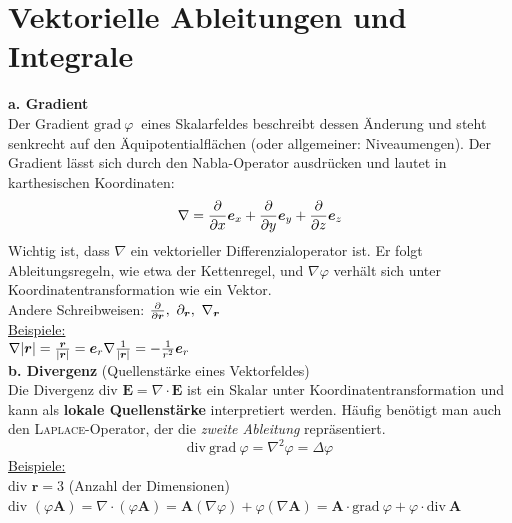\section{Vektorielle Ableitungen und Integrale}
\textbf{a. Gradient}\\
\linebreak
Der Gradient $\mathrm{grad\ }\varphi\ $ eines Skalarfeldes beschreibt dessen Änderung und steht senkrecht auf den Äquipotentialflächen (oder allgemeiner: Niveaumengen). Der Gradient lässt sich durch den Nabla-Operator ausdrücken und lautet in karthesischen Koordinaten: 
\begin{equation*}
\nabla=\frac{\partial{}}{\partial{x}}\bm{e}_x+\frac{\partial{}}{\partial{y}}\bm{e}_y+\frac{\partial{}}{\partial{z}}\bm{e}_z
\end{equation*}
Wichtig ist, dass $\nabla$ ein vektorieller Differenzialoperator ist. Er folgt Ableitungsregeln, wie etwa der Kettenregel, und $\nabla\varphi$ verhält sich unter Koordinatentransformation wie ein Vektor.\\
\linebreak
Andere Schreibweisen: $\pdiff{}{\bm{r}},\ \partial_{\bm{r}},\ \nabla_{\bm{r}}$\\
\linebreak
\underline{Beispiele:}\\
\linebreak
$\nabla |\bm{r}|=\frac{\bm{r}}{|\bm{r}|}=\bm{e}_r\\
\nabla \frac{1}{|\bm{r}|}=-\frac{1}{r^2}\bm{e}_r$\\
\linebreak\linebreak
\textbf{b. Divergenz} (Quellenstärke eines Vektorfeldes)\\
\linebreak
Die Divergenz div $\bm{E}=\nabla\cdot\bm{E}$ ist ein Skalar unter Koordinatentransformation und kann als \textbf{lokale Quellenstärke} interpretiert werden. Häufig benötigt man auch den \textsc{Laplace}-Operator, der die \emph{zweite Ableitung} repräsentiert.\\
\begin{equation*}
\mathrm{div\ grad\ } \varphi=\nabla^2\varphi=\Delta\varphi
\end{equation*}
\underline{Beispiele:}\\
\linebreak
div $\bm{r}=3$ (Anzahl der Dimensionen)\\
div $(\varphi\bm{A})=\nabla\cdot(\varphi\bm{A})=\bm{A}(\nabla\varphi)+\varphi(\nabla\bm{A})=\bm{A}\cdot\mathrm{grad\ }\varphi+\varphi\cdot\mathrm{div\ }\bm{A}$\\
